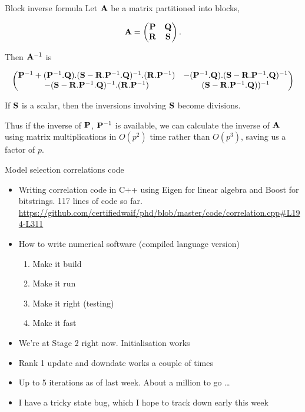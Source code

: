 \documentclass{beamer}
\begin{document}
\begin{frame}{Block inverse formula}
Let ${\bf A}$ be a matrix partitioned into blocks,

\small
\begin{equation*}
{\bf A} = \begin{pmatrix}
{\bf P} & {\bf Q} \\
{\bf R} & {\bf S}
\end{pmatrix}.
\end{equation*}
\normalsize

Then ${\bf A}^{-1}$ is

\small
\begin{equation*}
\begin{pmatrix}
{\bf P}^{-1} + ({\bf P}^{-1}.{\bf Q}).({\bf S} - {\bf R}.{\bf P}^{-1}.{\bf Q})^{-1}.({\bf R}.{\bf P}^{-1}) & -({\bf P}^{-1}.{\bf Q}).({\bf S} - {\bf R}.{\bf P}^{-1}.{\bf Q})^{-1} \\
-({\bf S} - {\bf R}.{\bf P}^{-1}.{\bf Q})^{-1}.({\bf R}.{\bf P}^{-1}) & ({\bf S} - {\bf R}.{\bf P}{^{-1}.{\bf Q}}))^{-1}
\end{pmatrix}
\end{equation*}
\normalsize

If ${\bf S}$ is a scalar, then the inversions involving ${\bf S}$ become divisions.

Thus if the inverse of ${\bf P}$, ${\bf P}^{-1}$ is available, we can calculate the inverse of ${\bf A}$ using matrix
multiplications in $O(p^2)$ time rather than $O(p^3)$, saving us a factor of $p$.

\end{frame}

\begin{frame}{Model selection correlations code}
\begin{itemize}
\item Writing correlation code in C++ using Eigen for linear algebra and Boost for bitstrings. 117
			lines of code so far.
			\url{https://github.com/certifiedwaif/phd/blob/master/code/correlation.cpp#L194-L311}
\item How to write numerical software (compiled language version) 
\begin{enumerate}
\item Make it build
\item Make it run
\item Make it right (testing)
\item Make it fast
\end{enumerate}
\item We're at Stage 2 right now. Initialisation works
\item Rank 1 update and downdate works a couple of times
\item Up to 5 iterations as of last week. About a million to go \ldots
\item I have a tricky state bug, which I hope to track down early this week
\end{itemize}
\end{frame}
\end{document}
